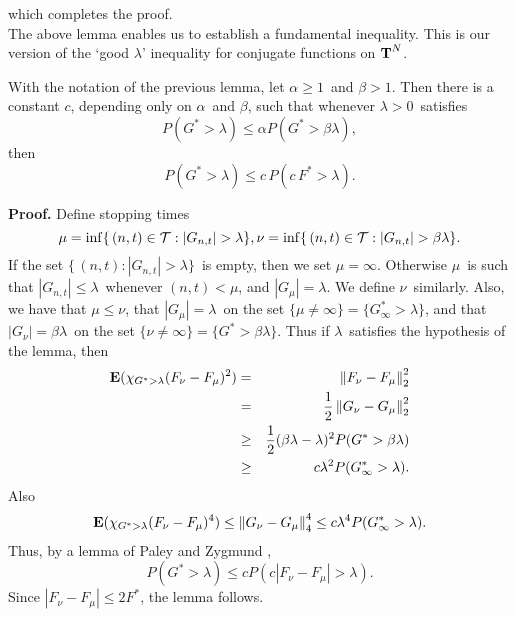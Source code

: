 which completes the proof.\\
The above lemma enables us to establish a 
fundamental inequality.
This is our version of the 
`good $\lambda$' inequality for conjugate functions on $\T^N$.
\begin{lemma5.4}
  With the notation of the previous lemma,
  let $\alpha \ge 1$\ and $\beta > 1$.  Then there is a
constant $c$, depending only on $\alpha$\ and $\beta$, 
such that whenever
$\lambda > 0$\ satisfies
$$ P(G^* > \lambda) \le \alpha P(G^* > \beta \lambda) ,$$
then
$$ P(G^* > \lambda) \le c\,P(c\,F^* > \lambda) .$$
\label{lemma5.4}
\end{lemma5.4}
{\bf Proof.}  
Define stopping times
$$   \mu = \inf\{\, (n,t)\in {\cal T} : |G_{n,t}| > \lambda \} ,\\
   \nu = \inf\{\, (n,t)\in {\cal T} : |G_{n,t}| > \beta \lambda \} . $$
If the set $\{\, (n,t) : |G_{n,t}| > \lambda \}$\ is empty, then we set
$\mu = \infty$.  Otherwise 
$\mu$\ is 
such that $|G_{n,t}| \le \lambda$\
whenever $(n,t) < \mu$, and $|G_\mu| = \lambda$.  
We define $\nu$\ similarly.
Also, we have
that $\mu \le \nu$, that $|G_\mu| = \lambda$\ 
on the set $\{\mu\ne\infty\}
= \{G_\infty^* > \lambda\}$, and that 
$|G_\nu| = \beta\lambda$\ on the set 
$\{\nu\ne\infty\}
= \{G^* > \beta\lambda\}$.  
Thus if $\lambda$\ satisfies the hypothesis of 
the lemma, then
\begin{eqnarray*}
   \E(\chi_{G^*>\lambda} (F_\nu-F_\mu)^2)
  & =  &
         \left\| F_\nu - F_\mu\right\|_2^2 \\
  & =  &
        \frac{1}{2} \left\| G_\nu - G_\mu\right\|_2^2 \\
  & \ge & \frac{1}{2} (\beta \lambda - \lambda)^2 
        P(G^*>\beta \lambda)     \\
  & \ge & c \lambda^2 P(G_\infty^* > \lambda ).  
   \end{eqnarray*}
Also
$$ \E(\chi_{G^*>\lambda} (F_\nu-F_\mu)^4) \le 
   \left\| G_\nu - G_\mu\right\|_4^4
   \le c \lambda^4 P(G_\infty^* > \lambda ). $$
Thus, by a lemma of Paley and Zygmund \cite[Chapter V, (8,26)]{zyg},
$$ P(G^* > \lambda) \le c P(c|F_\nu - F_\mu| > \lambda) .$$
Since $|F_\nu - F_\mu| \le 2 F^*$, the lemma follows.

